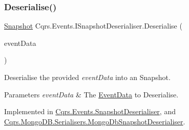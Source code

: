 \subsubsection{\texorpdfstring{Deserialise()}{Deserialise()}}
{\footnotesize\ttfamily \hyperlink{classCqrs_1_1Snapshots_1_1Snapshot}{Snapshot} Cqrs.\+Events.\+I\+Snapshot\+Deserialiser.\+Deserialise (\begin{DoxyParamCaption}\item[{\hyperlink{classCqrs_1_1Events_1_1EventData}{Event\+Data}}]{event\+Data }\end{DoxyParamCaption})}



Deserialise the provided {\itshape event\+Data}  into an Snapshot. 


\begin{DoxyParams}{Parameters}
{\em event\+Data} & The \hyperlink{classCqrs_1_1Events_1_1EventData}{Event\+Data} to Deserialise.\\
\hline
\end{DoxyParams}


Implemented in \hyperlink{classCqrs_1_1Events_1_1SnapshotDeserialiser_a0c2b0f71dd0aad4d4b65d847a6e50902_a0c2b0f71dd0aad4d4b65d847a6e50902}{Cqrs.\+Events.\+Snapshot\+Deserialiser}, and \hyperlink{classCqrs_1_1MongoDB_1_1Serialisers_1_1MongoDbSnapshotDeserialiser_ad7963b969a1edd5451605887933c0c89_ad7963b969a1edd5451605887933c0c89}{Cqrs.\+Mongo\+D\+B.\+Serialisers.\+Mongo\+Db\+Snapshot\+Deserialiser}.

